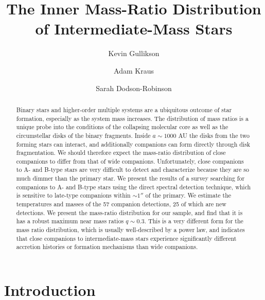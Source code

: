 \documentclass{emulateapj}
\begin{document}
\title{The Inner Mass-Ratio Distribution of Intermediate-Mass Stars}

\author{Kevin Gullikson }
\author{Adam Kraus }
\author{Sarah Dodson-Robinson }



\begin{abstract}
Binary stars and higher-order multiple systems are a ubiquitous outcome of star formation, especially as the system mass increases. The distribution of mass ratios is a unique probe into the conditions of the collapsing molecular core as well as the circumstellar disks of the binary fragments. Inside $a \sim 1000$ AU the disks from the two forming stars can interact, and additionally companions can form directly through disk fragmentation. We should therefore expect the mass-ratio distribution of close companions to differ from that of wide companions. Unfortunately, close companions to A- and B-type stars are very difficult to detect and characterize because they are so much dimmer than the primary star. We present the results of a survey searching for companions to A- and B-type stars using the direct spectral detection technique, which is sensitive to late-type companions within $\sim 1''$ of the primary. We estimate the temperatures and masses of the 57 companion detections, 25 of which are new detections. We present the mass-ratio distribution for our sample, and find that it is has a robust maximum near mass ratios $q \sim 0.3$. This is a very different form for the mass ratio distribution, which is usually well-described by a power law, and indicates that close companions to intermediate-mass stars experience significantly different accretion histories or formation mechanisms than wide companions.
\end{abstract}

\maketitle

\section{Introduction}
\end{document}
